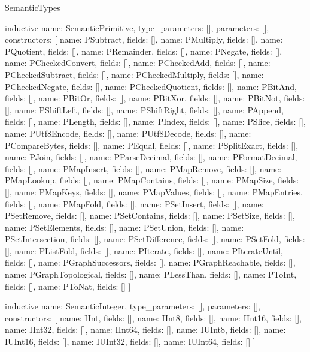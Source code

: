 \begin{lexlean}{SemanticTypes}
\begin{semanticmodule}
inductive{
  name: SemanticPrimitive,
  type_parameters: [],
  parameters: [],
  constructors: [
    {name: PSubtract, fields: []},
    {name: PMultiply, fields: []},
    {name: PQuotient, fields: []},
    {name: PRemainder, fields: []},
    {name: PNegate, fields: []},
    {name: PCheckedConvert, fields: []},
    {name: PCheckedAdd, fields: []},
    {name: PCheckedSubtract, fields: []},
    {name: PCheckedMultiply, fields: []},
    {name: PCheckedNegate, fields: []},
    {name: PCheckedQuotient, fields: []},
    {name: PBitAnd, fields: []},
    {name: PBitOr, fields: []},
    {name: PBitXor, fields: []},
    {name: PBitNot, fields: []},
    {name: PShiftLeft, fields: []},
    {name: PShiftRight, fields: []},
    {name: PAppend, fields: []},
    {name: PLength, fields: []},
    {name: PIndex, fields: []},
    {name: PSlice, fields: []},
    {name: PUtf8Encode, fields: []},
    {name: PUtf8Decode, fields: []},
    {name: PCompareBytes, fields: []},
    {name: PEqual, fields: []},
    {name: PSplitExact, fields: []},
    {name: PJoin, fields: []},
    {name: PParseDecimal, fields: []},
    {name: PFormatDecimal, fields: []},
    {name: PMapInsert, fields: []},
    {name: PMapRemove, fields: []},
    {name: PMapLookup, fields: []},
    {name: PMapContains, fields: []},
    {name: PMapSize, fields: []},
    {name: PMapKeys, fields: []},
    {name: PMapValues, fields: []},
    {name: PMapEntries, fields: []},
    {name: PMapFold, fields: []},
    {name: PSetInsert, fields: []},
    {name: PSetRemove, fields: []},
    {name: PSetContains, fields: []},
    {name: PSetSize, fields: []},
    {name: PSetElements, fields: []},
    {name: PSetUnion, fields: []},
    {name: PSetIntersection, fields: []},
    {name: PSetDifference, fields: []},
    {name: PSetFold, fields: []},
    {name: PListFold, fields: []},
    {name: PIterate, fields: []},
    {name: PIterateUntil, fields: []},
    {name: PGraphSuccessors, fields: []},
    {name: PGraphReachable, fields: []},
    {name: PGraphTopological, fields: []},
    {name: PLessThan, fields: []},
    {name: PToInt, fields: []},
    {name: PToNat, fields: []}
  ]
}

inductive{
  name: SemanticInteger,
  type_parameters: [],
  parameters: [],
  constructors: [
    {name: IInt, fields: []},
    {name: IInt8, fields: []},
    {name: IInt16, fields: []},
    {name: IInt32, fields: []},
    {name: IInt64, fields: []},
    {name: IUInt8, fields: []},
    {name: IUInt16, fields: []},
    {name: IUInt32, fields: []},
    {name: IUInt64, fields: []}
  ]
}


\end{semanticmodule}
\end{lexlean}

